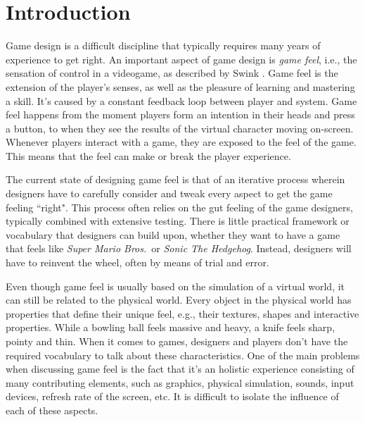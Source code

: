 \section{Introduction}
Game design is a difficult discipline that typically requires many years of experience to get right. An important aspect of game design is \textit{game feel}, i.e., the sensation of control in a videogame, as described by Swink \cite{swink}. Game feel is the extension of the player's senses, as well as the pleasure of learning and mastering a skill. It's caused by a constant feedback loop between player and system. Game feel happens from the moment players form an intention in their heads and press a button, to when they see the results of the virtual character moving on-screen. Whenever players interact with a game, they are exposed to the feel of the game. This means that the feel can make or break the player experience.

The current state of designing game feel is that of an iterative process wherein designers have to carefully consider and tweak every aspect to get the game feeling ``right". This process often relies on the gut feeling of the game designers, typically combined with extensive testing. There is little practical framework or vocabulary that designers can build upon, whether they want to have a game that feels like \textit{Super Mario Bros.}\ or \textit{Sonic The Hedgehog}. Instead, designers will have to reinvent the wheel, often by means of trial and error.

Even though game feel is usually based on the simulation of a virtual world, it can still be related to the physical world. Every object in the physical world has properties that define their unique feel, e.g., their textures, shapes and interactive properties. While a bowling ball feels massive and heavy, a knife feels sharp, pointy and thin. When it comes to games, designers and players don't have the required vocabulary to talk about these characteristics. One of the main problems when discussing game feel is the fact that it's an holistic experience consisting of many contributing elements, such as graphics, physical simulation, sounds, input devices, refresh rate of the screen, etc. It is difficult to isolate the influence of each of these aspects.

